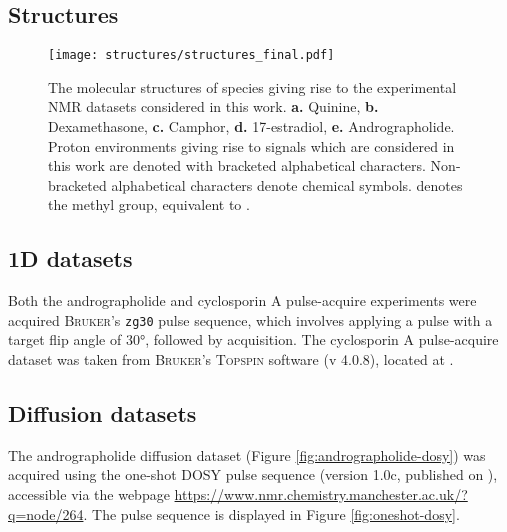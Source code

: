 \subsection{Structures}

\begin{figure}[H]
    \centering
    \texttt{[image: structures/structures\_final.pdf]}
    \caption[
        The molecular structures of species giving rise to the experimental
        \acs{NMR} datasets considered in this work.
    ]{
        The molecular structures of species giving rise to the experimental
        \acs{NMR} datasets considered in this work.
        \textbf{a.} Quinine,
        \textbf{b.} Dexamethasone,
        \textbf{c.} Camphor,
        \textbf{d.} 17\textbeta-estradiol,
        \textbf{e.} Andrographolide.
        Proton environments giving rise to signals which are considered in this
        work are denoted with bracketed alphabetical characters. Non-bracketed
        alphabetical characters denote chemical symbols.  denotes the methyl
        group, equivalent to .
    }
    \label{fig:structures}
\end{figure}

\subsection{\acs{1D} datasets}
Both the andrographolide and cyclosporin A pulse-acquire experiments were
acquired \textsc{Bruker}'s \texttt{zg30} pulse sequence, which involves
applying a pulse with a target flip angle of \ang{30}, followed by acquisition.
The cyclosporin A pulse-acquire dataset was taken from \textsc{Bruker}'s
\textsc{Topspin} software (v 4.0.8), located at
.



\subsection{Diffusion datasets}
The andrographolide diffusion dataset (Figure \ref{fig:andrographolide-dosy})
was acquired using the one-shot \ac{DOSY} pulse sequence\cite{Pelta2002}
(version 1.0c, published on ), accessible via the webpage
\url{https://www.nmr.chemistry.manchester.ac.uk/?q=node/264}. The pulse
sequence is displayed in Figure \ref{fig:oneshot-dosy}.

